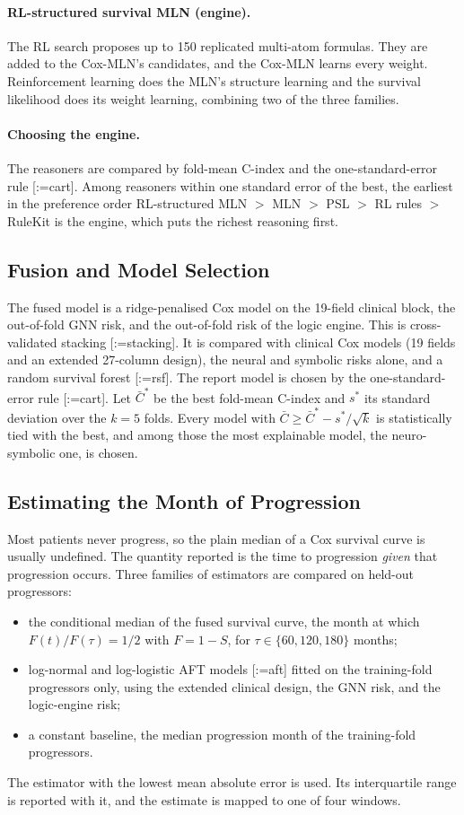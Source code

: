 \documentclass{mnnit}
\makeatletter
\newcommand{\rc}[1]{[\def\rc@sep{}\@for\rc@key:=#1\do{\rc@sep\ref{ref:\rc@key}\def\rc@sep{, }}]}
\makeatother
\begin{document}
\paragraph{RL-structured survival MLN (engine).} The RL search proposes up to 150 replicated multi-atom formulas.
They are added to the Cox-MLN's candidates, and the Cox-MLN learns every weight. Reinforcement learning does the MLN's
structure learning and the survival likelihood does its weight learning, combining two of the three families.

\paragraph{Choosing the engine.} The reasoners are compared by fold-mean C-index and the one-standard-error rule
\rc{cart}. Among reasoners within one standard error of the best, the earliest in the preference order RL-structured
MLN $>$ MLN $>$ PSL $>$ RL rules $>$ RuleKit is the engine, which puts the richest reasoning first.

\subsection{Fusion and Model Selection}
The fused model is a ridge-penalised Cox model on the 19-field clinical block, the out-of-fold GNN risk, and the
out-of-fold risk of the logic engine. This is cross-validated stacking \rc{stacking}. It is compared with clinical Cox models (19
fields and an extended 27-column design), the neural and symbolic risks alone, and a random survival forest
\rc{rsf}. The report model is chosen by the one-standard-error rule \rc{cart}. Let $\bar{C}^*$ be the best
fold-mean C-index and $s^*$ its standard deviation over the $k=5$ folds. Every model with
$\bar{C} \ge \bar{C}^* - s^*/\sqrt{k}$ is statistically tied with the best, and among those the most explainable
model, the neuro-symbolic one, is chosen.

\subsection{Estimating the Month of Progression}
Most patients never progress, so the plain median of a Cox survival curve is usually undefined. The quantity
reported is the time to progression \emph{given} that progression occurs. Three families of estimators are
compared on held-out progressors:
\begin{itemize}
  \item the conditional median of the fused survival curve, the month at which $F(t)/F(\tau) = 1/2$ with
        $F = 1 - S$, for $\tau \in \{60, 120, 180\}$ months;
  \item log-normal and log-logistic AFT models \rc{aft} fitted on the training-fold progressors only, using the
        extended clinical design, the GNN risk, and the logic-engine risk;
  \item a constant baseline, the median progression month of the training-fold progressors.
\end{itemize}
The estimator with the lowest mean absolute error is used. Its interquartile range is reported with it, and the
estimate is mapped to one of four windows.
\end{document}
